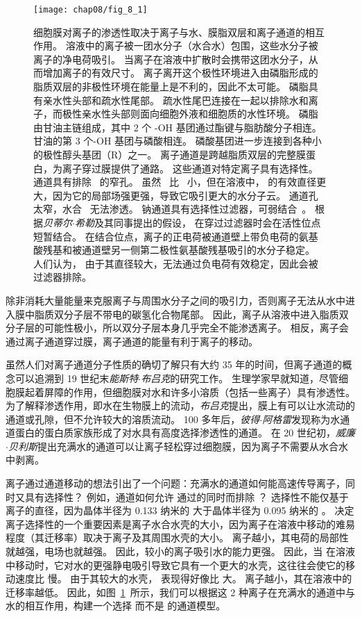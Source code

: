 \begin{figure}[htbp]
	\centering
	\texttt{[image: chap08/fig\_8\_1]}
	\caption{细胞膜对离子的渗透性取决于离子与水、膜脂双层和离子通道的相互作用。
		溶液中的离子被一团水分子（水合水）包围，这些水分子被离子的净电荷吸引。
		当离子在溶液中扩散时会携带这团水分子，从而增加离子的有效尺寸。
		离子离开这个极性环境进入由磷脂形成的脂质双层的非极性环境在能量上是不利的，因此不太可能。
		磷脂具有亲水性头部和疏水性尾部。
		疏水性尾巴连接在一起以排除水和离子，而极性亲水性头部则面向细胞外液和细胞质的水性环境。
		磷脂由甘油主链组成，其中 2 个 -OH 基团通过酯键与脂肪酸分子相连。
		甘油的第 3 个-OH 基团与磷酸相连。
		磷酸基团进一步连接到各种小的极性醇头基团（R）之一。
		离子通道是跨越脂质双层的完整膜蛋白，为离子穿过膜提供了通路。
		这些通道对特定离子具有选择性。
		通道具有排除~ 的窄孔。
		虽然~ 比~ 小，但在溶液中， 的有效直径更大，因为它的局部场强更强，导致它吸引更大的水分子云。
		 通道孔太窄，水合~ 无法渗透。
		钠通道具有选择性过滤器，可弱结合~。
		根据\textit{贝蒂尔$\cdot$希勒}及其同事提出的假设， 在穿过过滤器时会在活性位点短暂结合。
		在结合位点，离子的正电荷被通道壁上带负电荷的氨基酸残基和被通道壁另一侧第二极性氨基酸残基吸引的水分子稳定。
		人们认为， 由于其直径较大，无法通过负电荷有效稳定，因此会被过滤器排除。}
	\label{fig:8_1}
\end{figure}


除非消耗大量能量来克服离子与周围水分子之间的吸引力，否则离子无法从水中进入膜中脂质双分子层不带电的碳氢化合物尾部。
因此，离子从溶液中进入脂质双分子层的可能性极小，所以双分子层本身几乎完全不能渗透离子。
相反，离子会通过离子通道穿过膜，离子通道的能量有利于离子的移动。


虽然人们对离子通道分子性质的确切了解只有大约 35 年的时间，但离子通道的概念可以追溯到 19 世纪末\textit{能斯特$\cdot$布吕克}的研究工作。
生理学家早就知道，尽管细胞膜起着屏障的作用，但细胞膜对水和许多小溶质（包括一些离子）具有渗透性。
为了解释渗透作用，即水在生物膜上的流动，\textit{布吕克}提出，膜上有可以让水流动的通道或孔隙，但不允许较大的溶质流动。
100 多年后，\textit{彼得$\cdot$阿格雷}发现称为水通道蛋白的蛋白质家族形成了对水具有高度选择渗透性的通道。
在 20 世纪初，\textit{威廉$\cdot$贝利斯}提出充满水的通道可以让离子轻松穿过细胞膜，因为离子不需要从水合水中剥离。


离子通过通道移动的想法引出了一个问题：充满水的通道如何能高速传导离子，同时又具有选择性？
例如，通道如何允许  通过的同时而排除 ？
选择性不能仅基于离子的直径，因为晶体半径为 0.133 纳米的  大于晶体半径为 0.095 纳米的 。
决定离子选择性的一个重要因素是离子水合水壳的大小，因为离子在溶液中移动的难易程度（其迁移率）取决于离子及其周围水壳的大小。
离子越小，其电荷的局部性就越强，电场也就越强。
因此，较小的离子吸引水的能力更强。
因此，当  在溶液中移动时，它对水的更强静电吸引导致它具有一个更大的水壳，这往往会使它的移动速度比  慢。
由于其较大的水壳， 表现得好像比  大。
离子越小，其在溶液中的迁移率越低。
因此，如图~\ref{fig:8_1}~所示，我们可以根据这 2 种离子在充满水的通道中与水的相互作用，构建一个选择  而不是  的通道模型。


